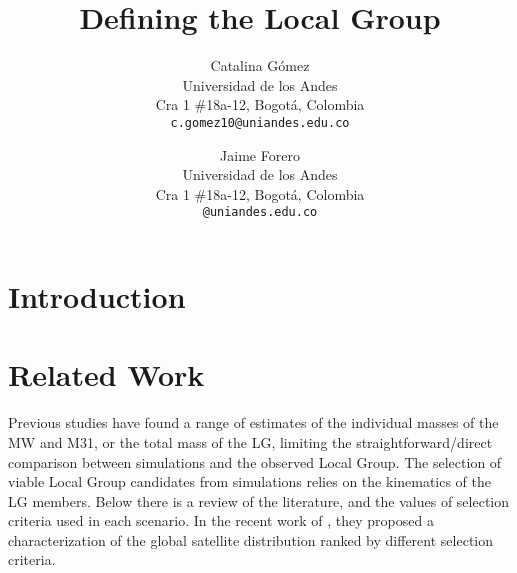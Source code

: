 \documentclass[10pt,twocolumn,letterpaper]{article}
\begin{document}
\title{Defining the Local Group}

\author{Catalina G\'omez\\
Universidad de los Andes \\
Cra 1 \#18a-12, Bogot\'a, Colombia\\
{\tt\small c.gomez10@uniandes.edu.co}
\and 
Jaime Forero\\
Universidad de los Andes\\
Cra 1 \#18a-12, Bogot\'a, Colombia\\
{\tt\small @uniandes.edu.co}
}

\maketitle

 \begin{abstract}

 \end{abstract}


\section{Introduction}
 
\section{Related Work}
Previous studies have found a range of estimates of the individual masses of the MW and M31, or the total mass of the LG\cite{fattahi2016apostle}, limiting the straightforward/direct comparison between simulations and the observed Local Group. The selection of viable Local Group candidates from simulations relies on the kinematics of the LG members. Below there is a review of the literature, and the values of selection criteria used in each scenario. 
In the recent work of \cite{forero2018we}, they proposed a characterization of the global satellite distribution ranked by different selection criteria.
\end{document}
